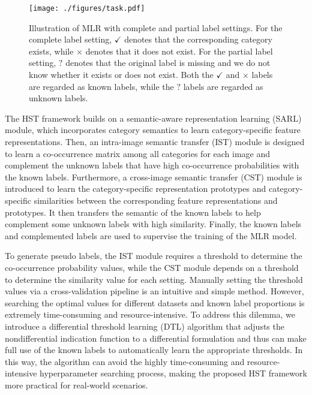 \begin{figure}[!t]
   \centering
   \texttt{[image: ./figures/task.pdf]}
   \caption{Illustration of MLR with complete and partial label settings. For the complete label setting, $\checkmark$ denotes that the corresponding category exists, while $\times$ denotes that it does not exist. For the partial label setting, $\textbf{?}$ denotes that the original label is missing and we do not know whether it exists or does not exist. Both the $\checkmark$ and $\times$ labels are regarded as known labels, while the $\textbf{?}$ labels are regarded as unknown labels.}
   \label{fig:task}
\end{figure}

The HST framework builds on a semantic-aware representation learning (SARL) module, which incorporates category semantics to learn category-specific feature representations. Then, an intra-image semantic transfer (IST) module is designed to learn a co-occurrence matrix among all categories for each image and complement the unknown labels that have high co-occurrence probabilities with the known labels. Furthermore, a cross-image semantic transfer (CST) module is introduced to learn the category-specific representation prototypes and category-specific similarities between the corresponding feature representations and prototypes. It then transfers the semantic of the known labels to help complement some unknown labels with high similarity. Finally, the known labels and complemented labels are used to supervise the training of the MLR model.

To generate pseudo labels, the IST module requires a threshold to determine the co-occurrence probability values, while the CST module depends on a threshold to determine the similarity value for each setting. Manually setting the threshold values via a cross-validation pipeline is an intuitive and simple method. However, searching the optimal values for different datasets and known label proportions is extremely time-consuming and resource-intensive. To address this dilemma, we introduce a differential threshold learning (DTL) algorithm that adjusts the nondifferential indication function to a differential formulation and thus can make full use of the known labels to automatically learn the appropriate thresholds. In this way, the algorithm can avoid the highly time-consuming and resource-intensive hyperparameter searching process, making the proposed HST framework more practical for real-world scenarios.

